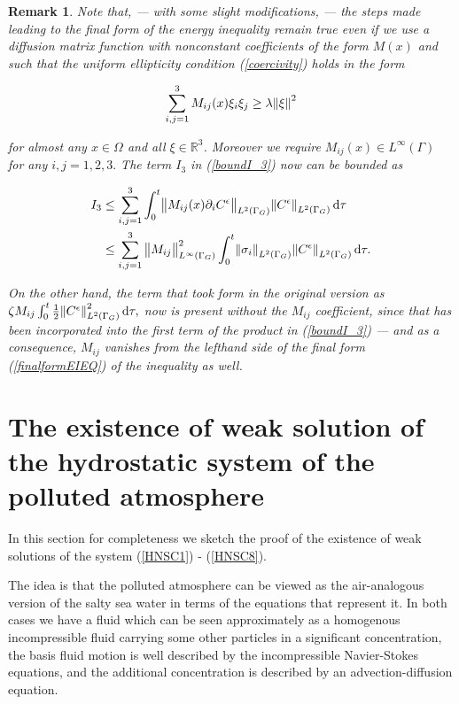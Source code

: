 \documentclass[11pt]{article}
\newtheorem{remark}{Remark}
\newcommand*\diff{\mathop{}\!\mathrm{d}}
\begin{document}
\begin{remark}
\normalfont Note that, --- with some slight modifications, --- the steps made leading to the final form of the energy inequality remain true even if we use a diffusion matrix function with nonconstant coefficients of the form $M(x)$ and such that the uniform ellipticity condition (\ref{coercivity}) holds in the form

\begin{equation}
   \sum_{i,j = 1}^3 M_{ij}(x) \xi_i \xi_j \geq \lambda \norm{\xi}^2
\end{equation}

for almost any $x \in \Omega$ and all $\xi \in \mathbb{R}^3$. Moreover we require $M_{ij} (x) \in L^\infty (\Gamma)$ for any $i,j = 1,2,3.$
The term $I_3$ in (\ref{boundI_3}) now can be bounded as

  \begin{equation}
    \begin{split}  
I_3 & \leq \sum_{i,j = 1}^3 \int _ 0 ^ t \norm{ M_{ij} (x) \partial_i C^\epsilon}_{L^2 (\Gamma_G)}  \norm{C^\epsilon}_{L^2 (\Gamma_G)} \diff \tau\\
 & \leq \sum_{i,j = 1}^3 \big \|{M_{ij} \big \|}^2_{L^\infty(\Gamma_G)} \int_0 ^ t \norm{\sigma_i} _{L^2 (\Gamma_G)} \norm{C^\epsilon} _{L^2 (\Gamma_G)} \diff \tau. 
      \end{split}  
  \end{equation}


On the other hand, the term that took form in the original version as
$\zeta M_{ij} \int_0 ^ t \frac{1}{2} \norm{C^\epsilon}^2 _{L^2 (\Gamma_G)} \diff \tau,$ now is present without the $M_{ij}$ coefficient, since that has been incorporated into the first term of the product in (\ref{boundI_3}) --- and as a consequence, $M_{ij}$ vanishes from the lefthand side of the final form (\ref{finalformEIEQ}) of the inequality as well.
\end{remark}

\appendix

\section{The existence of weak solution of the hydrostatic system of the polluted atmosphere}

In this section for completeness we sketch the proof of the existence of weak solutions of the system (\ref{HNSC1}) - (\ref{HNSC8}).

The idea is that the polluted atmosphere can be viewed as the air-analogous version of the salty sea water in terms of the equations that represent it. In both cases we have a fluid which can be seen approximately as a homogenous incompressible fluid carrying some other particles in a significant concentration, the basis fluid motion is well described by the incompressible Navier-Stokes equations, and the additional concentration is described by an advection-diffusion equation. 
\end{document}
